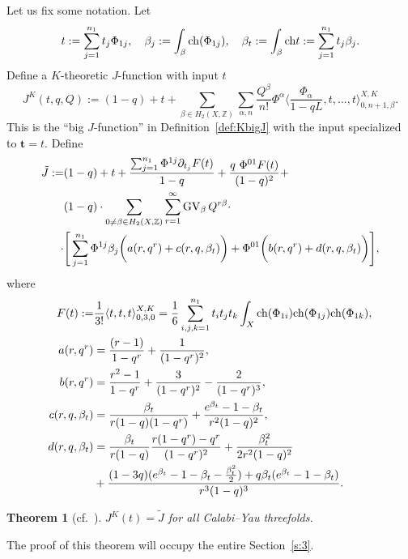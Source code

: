 \documentclass[11pt]{amsart}
\newtheorem{theorem}{Theorem}[section]
\newtheorem*{main theorem*}{Main Theorem}
\theoremstyle{remark}
\numberwithin{equation}{section}
\newcommand{\ch}{{\rm ch}}
\newcommand{\GV}{{\mathrm{GV}}}
\begin{document}
Let us fix some notation. Let 
\[
 t := \sum_{j=1}^{n_1} t_{j} \Phi_{1j}, \quad  \beta_j := \int_{\beta} \ch(\Phi_{1j}), \quad  \beta_t := \int_{\beta} \ch t := \sum_{j=1}^{n_1} t_{j} \beta_j.
\]
Define a $K$-theoretic $J$-function with input $t$
\[
J^K(t,q,Q)  := (1-q) + t + \sum_{\beta \in H_2(X,\mathbb{Z})}\sum_{ \alpha,n} \frac{Q^{\beta}}{n!} \Phi^{\alpha} \langle \frac{\Phi_{\alpha}}{1-qL}, t,\dots, t \rangle^{X,K}_{0,n+1,\beta}.
\]
This is the ``big $J$-function'' in Definition~\ref{def:KbigJ} with the input specialized to $\mathbf{t} =t$. 
Define
\begin{equation} \label{e:jtilde}
\begin{split}
    \Tilde{J}  :=   &(1-q) +
     t + \frac{ \sum_{j=1}^{n_1}\Phi^{1j} \partial_{t_j}F(t)  }{1-q} + \frac{q\ \Phi^{01} F(t)}{(1-q)^2} + \\
     &(1-q)\cdot\sum_{0\neq \beta \in H_2(X,\mathbb{Z}) } \sum_{r=1}^{\infty} \GV_{\beta}\, Q^{r\beta} \cdot
    \\
    \hspace{0mm} \cdot & \Bigg[ \sum_{j=1}^{n_1} \Phi^{1j} \beta_j\bigg(   a(r, q^r) + c(r,q,\beta_t) \bigg)  + \Phi^{01} \bigg( b(r,q^r) + d(r,q,\beta_t)  \bigg) \Bigg],
\end{split}
\end{equation}
where
\[
\begin{split}
    F(t) := &\frac{1}{3!}\langle t,t,t\rangle^{X,K}_{0,3,0} = \frac{1}{6}\sum_{i,j,k=1}^{n_1} t_it_jt_k\int_X \ch(\Phi_{1i})\ch(\Phi_{1j})\ch(\Phi_{1k}),
    \\
      a(r,q^r) &= \frac{(r-1)}{1-q^r} + \frac{1}{(1-q^r)^2},
    \\
     b(r,q^r) &= \frac{r^2-1}{1-q^r} + \frac{3}{(1-q^r)^2} -\frac{2}{(1-q^r)^3} ,
    \\
    c(r,q,\beta_t) &= \frac{\beta_t}{r(1-q)(1-q^r)} + \frac{ e^{\beta_t} -1 - \beta_t }{r^2(1-q)^2},
    \\
    d(r,q,\beta_t) &= \frac{\beta_t}{r(1-q)} \frac{ r(1-q^r) - q^r }{(1-q^r)^2} + \frac{ \beta_t^2 }{2r^2 (1-q)^2}
    \\
    & +\frac{ (1-3q)(e^{\beta_t} - 1 - \beta_t - \frac{\beta_t^2}{2}) + q \beta_t (e^{\beta_t} -1 -\beta_t) }{r^3(1-q)^3}.
\end{split}
\]
\begin{theorem} [{cf.~\cite{Jockers_Mayr_2019}}] \label{conjecture_npt}  
$J^K (t) = \tilde{J}$ for all Calabi--Yau threefolds.
\end{theorem}
The proof of this theorem will occupy the entire Section~\ref{s:3}.
\end{document}

